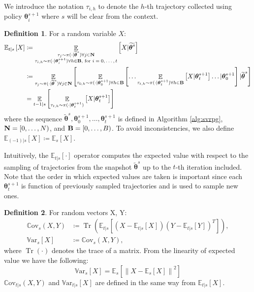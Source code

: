 \documentclass{article}
\theoremstyle{remark}
\theoremstyle{definition}
\newtheorem{definition}{Definition}[section]
\DeclareMathOperator*{\EV}{\mathbb{E}}
\DeclareMathOperator{\Tr}{Tr}
\newcommand{\EVV}[2][\ppvect \in \ppspace]{\EV_{#1}\left[{#2}\right]}
\newcommand{\norm}[2][\infty]{\left\|#2\right\|_{#1}}
\newcommand{\vtheta}{\boldsymbol{\theta}}
\newcommand{\Ets}[2][t]{\mathbb{E}_{#1\vert s}\left[#2\right]}
\newcommand{\Es}[1]{\mathbb{E}_{s}\left[#1\right]}
\newcommand{\Covts}[3][t]{{\mathbb{C}\text{ov}}_{#1\vert s}\left(#2,#3\right)}
\newcommand{\Covs}[2]{{\mathbb{C}\text{ov}}_{s}\left(#1,#2\right)}
\newcommand{\Varts}[2][t]{{\mathbb{V}\text{ar}}_{#1\vert s}\left[#2\right]}
\newcommand{\Vars}[1]{{\mathbb{V}\text{ar}}_{s}\left[#1\right]}
\newcommand{\wt}[1]{\widetilde{#1}}
\begin{document}
We introduce the notation $\tau_{i,h}$ to denote the $h$-th trajectory collected using policy $\vtheta^{s+1}_i$ where $s$ will be clear from the context.

\begin{definition}
For a random variable $X$:
\begin{align*}
        \mathbb{E}_{t\vert s}\left[X\right] &\coloneqq 
		\mathop{\mathbb{E}}_{\substack{\tau_j\sim\pi(\cdot\vert\wt{\vtheta}^s)\forall j \in {\it {\bf N}} \\ \tau_{i,h}\sim\pi(\cdot\vert\vtheta^{s+1}_i) \forall h \in {\it {\bf B}}, \text{ for $i=0,\dots,t$}}}{\left[X \vert \wt{\vtheta^s}\right]} \\
	&\coloneqq \EVV[\tau_j\sim\pi(\cdot\vert\wt{\vtheta}^s)\forall j \in {\it {\bf N}}]{
			\EVV[\tau_{0,h}\sim\pi(\cdot\vert\vtheta_0^{s+1}) \forall h \in {\it {\bf B}}]
				{\dots
					\EVV[\tau_{t,h}\sim\pi(\cdot\vert\vtheta_t^{s+1})\forall h \in {\it {\bf B}}]
						{X\vert\vtheta_t^{s+1}}
				 \dots
			\vert\vtheta_0^{s+1}}
		\vert\wt{\vtheta}^s}\\
        &= \EVV[t-1|s]{\EVV[\tau_{t,h}\sim \pi(\cdot|\vtheta^{s+1}_t)]{X|\vtheta^{s+1}_t}}
\end{align*}
where the sequence $\wt{\vtheta}^s,\vtheta_0^{s+1},\dots,\vtheta_t^{s+1}$ is defined in Algorithm \ref{alg:svrpg}, ${\it {\bf N}} = [0,\dots,N)$, and ${\it {\bf B}} = [0,\dots,B)$. To avoid inconsistencies, we also define $\Ets[(-1)]{X} \coloneqq \Es{X}$.

\end{definition}
Intuitively, the $\Ets{\cdot}$ operator computes the expected value with respect to the sampling of trajectories from the snapshot $\wt{\vtheta}^s$ up to the $t$-th iteration included. Note that the order in which expected values are taken is important since each $\vtheta_{t}^{s+1}$ is function of previously sampled trajectories and is used to sample new ones.

\begin{definition}\label{def:var}
For random vectors X, Y:
\begin{align*}
	\Covs{X}{Y} &\coloneqq \Tr\left(\Ets{(X-\Ets{X})(Y-\Ets{Y})^T}\right), \\
	\Vars{X} &\coloneqq \Covs{X}{Y},
\end{align*}
where $\Tr(\cdot)$ denotes the trace of a matrix. From the linearity of expected value we have the following:
\begin{equation}\label{neweq:1}
\Vars{X} = \Es{\norm[]{X-\Es{X}}^2}
\end{equation}
$\Covts[t]{X}{Y}$ and $\Varts[t]{X}$ are defined in the same way from $\Ets[t]{X}$.
\end{definition}
\end{document}
